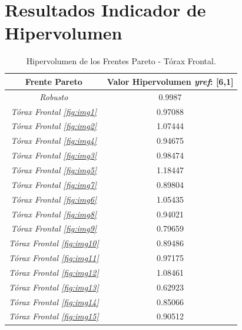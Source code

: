 \section{Resultados Indicador de Hipervolumen}

\begin{table}[H]
\centering
\caption{Hipervolumen de los Frentes Pareto - Tórax Frontal.}
\begin{tabular}{|c|c|}
\hline
Frente Pareto & Valor Hipervolumen {\it yref}: [6,1] \\
\hline \hline 
\it{Robusto} &  0.9987\\ \hline
\it{Tórax Frontal \ref{fig:img1}} & 0.97088 \\ \hline
\it{Tórax Frontal \ref{fig:img2}} & 1.07444 \\ \hline
\it{Tórax Frontal \ref{fig:img4}} & 0.94675 \\ \hline
\it{Tórax Frontal \ref{fig:img3}} & 0.98474 \\ \hline
\it{Tórax Frontal \ref{fig:img5}} & 1.18447 \\ \hline
\it{Tórax Frontal \ref{fig:img7}} & 0.89804 \\ \hline
\it{Tórax Frontal \ref{fig:img6}} & 1.05435 \\ \hline
\it{Tórax Frontal \ref{fig:img8}} & 0.94021 \\ \hline
\it{Tórax Frontal \ref{fig:img9}} & 0.79659 \\ \hline
\it{Tórax Frontal \ref{fig:img10}} & 0.89486 \\ \hline
\it{Tórax Frontal \ref{fig:img11}} & 0.97175 \\ \hline
\it{Tórax Frontal \ref{fig:img12}} & 1.08461 \\ \hline
\it{Tórax Frontal \ref{fig:img13}} & 0.62923 \\ \hline
\it{Tórax Frontal \ref{fig:img14}} & 0.85066 \\ \hline
\it{Tórax Frontal \ref{fig:img15}} & 0.90512 \\ \hline
\end{tabular}
\label{tabla:hipervolumen-frontal}
\end{table}


